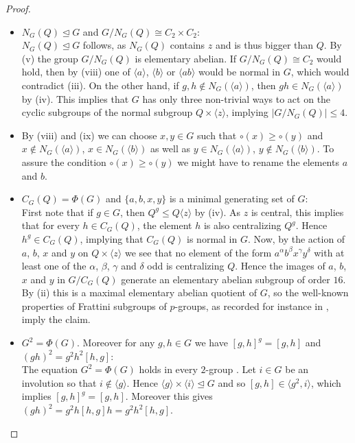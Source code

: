 \documentclass[a4paper,10pt]{amsart}
\theoremstyle{definition}
\theoremstyle{remark}
\begin{document}
\begin{proof}
\begin{itemize}
\item[(ix)] $N_G(Q) \unlhd G$ and $G/N_G(Q) \cong C_2 \times C_2$:\\
$N_G(Q)\unlhd G$ follows, as $N_G(Q)$ contains $z$ and is thus bigger than $Q$. By (v) the group $G/N_G(Q)$ is elementary abelian. If $G/N_G(Q) \cong C_2$ would hold, then by (viii) one of $\langle a \rangle$, $\langle b \rangle$ or $\langle ab \rangle$ would be normal in $G$, which would contradict (iii). On the other hand, if $g,h \notin N_G(\langle a \rangle)$, then $gh \in N_G(\langle a \rangle)$ by (iv). This implies that $G$ has only three non-trivial ways to act on the cyclic subgroups of the normal subgroup $Q \times \langle z \rangle$, implying $|G/N_G(Q)| \leq 4$.

\item[Convention:] By (viii) and (ix) we can choose $x,y \in G$ such that $\circ(x) \geq \circ(y)$ and $x \notin N_G(\langle a \rangle)$, $x \in N_G(\langle b \rangle)$ as well as $y \in N_G(\langle a \rangle)$, $y \notin N_G(\langle b \rangle)$. To assure the condition $\circ(x) \geq \circ(y)$ we might have to rename the elements $a$ and $b$.

\item[(x)] $C_G(Q) = \Phi(G)$ and $\{a,b,x,y \}$ is a minimal generating set of $G$:\\
First note that if $g \in G$, then $Q^g \leq Q \langle z \rangle$ by (iv). As $z$ is central, this implies that for every $h \in C_G(Q)$, the element $h$ is also centralizing $Q^g$. Hence $h^g \in C_G(Q)$, implying that $C_G(Q)$ is normal in $G$.
Now, by the action of $a$, $b$, $x$ and $y$ on $Q \times \langle z \rangle$ we see that no element of the form $a^\alpha b^\beta x^\gamma y^\delta$ with at least one of the $\alpha$, $\beta$, $\gamma$ and $\delta$ odd is centralizing $Q$. Hence the images of $a$, $b$, $x$ and $y$ in $G/C_G(Q)$ generate an elementary abelian subgroup of order $16$. By (ii) this is a maximal elementary abelian quotient of $G$, so the well-known properties of Frattini subgroups of $p$-groups, as recorded for instance in \cite[III, Section 3]{Huppert}, imply the claim.

\item[(xi)] $G^2 = \Phi(G)$. Moreover for any $g,h \in G$ we have $[g,h]^g = [g,h]$ and $(gh)^2 = g^2h^2[h,g]$:\\
The equation $G^2 = \Phi(G)$ holds in every $2$-group \cite[III, Satz 3.14(b)]{Huppert}. Let $i \in G$ be an involution so that $i \notin \langle g \rangle$. Hence $\langle g \rangle \times \langle i \rangle \unlhd G$ and so $[g,h] \in \langle g^2, i \rangle$, which implies $[g,h]^g = [g,h]$. Moreover this gives $(gh)^2 = g^2h[h,g]h = g^2h^2[h,g]$.


\end{itemize}
\end{proof}
\end{document}

